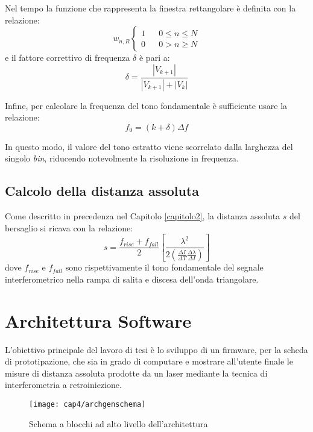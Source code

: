 Nel tempo la funzione che rappresenta la finestra rettangolare è definita con la relazione: 
\begin{equation}
w_{n,R}
\left\{\begin{matrix}
1 & & 0 \leq n \leq N \\ 
0  &  & 0 > n \geq N
\end{matrix}\right.
\end{equation}
e il fattore correttivo di frequenza $\delta$ è pari a:
\begin{equation}
	\delta = \frac{|V_{k+1}|}{|V_{k+1}| + |V_k|}
\end{equation}

Infine, per calcolare la frequenza del tono fondamentale è sufficiente usare la relazione: 
\begin{equation}
	f_0 = (k + \delta)\Delta f
\end{equation}

In questo modo, il valore del tono estratto viene scorrelato dalla larghezza del singolo \textit{bin}, riducendo notevolmente la risoluzione in frequenza. 

\subsection{Calcolo della distanza assoluta}
Come descritto in precedenza nel Capitolo \ref{capitolo2}, la distanza assoluta $s$ del bersaglio si ricava con la relazione:
\begin{equation}
	s = \frac{f_{rise}+f_{fall}}{2} \left [ \frac{\lambda^2}{2\left ( \frac{\Delta I}{\Delta T} \frac{\Delta \lambda}{\Delta I} \right )}  \right ]
\end{equation}
dove $f_{rise}$ e $f_{fall}$ sono rispettivamente il tono fondamentale del segnale interferometrico nella rampa di salita e discesa dell'onda triangolare.
	
\section{Architettura Software}
L'obiettivo principale del lavoro di tesi è lo sviluppo di un firmware, per la scheda di prototipazione, che sia in grado di computare e mostrare all'utente finale le misure di distanza assoluta prodotte da un laser mediante la tecnica di interferometria a retroiniezione.
\begin{figure}  
  \begin{center}
    \texttt{[image: cap4/archgenschema]}
    \caption{Schema a blocchi ad alto livello dell'architettura}
    \label{archgenschema}
  \end{center}
\end{figure}

